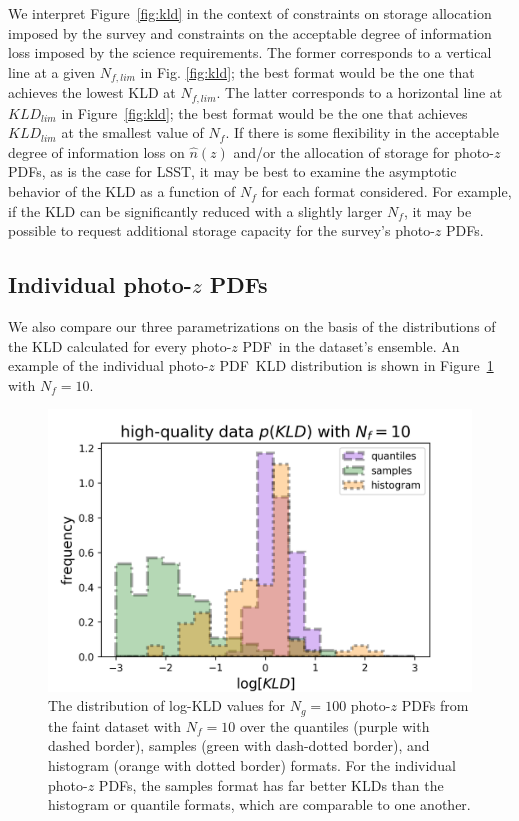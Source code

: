 \documentclass[\docopts]{\docclass}
\newcommand{\pz}{photo-$z$ PDF}
\newcommand{\ssdata}{faint\xspace}
\begin{document}
We interpret Figure~\ref{fig:kld} in the context of constraints on storage 
allocation imposed by the survey and constraints on the acceptable degree of 
information loss imposed by the science requirements.
The former corresponds to a vertical line at a given $N_{f, lim}$ in Fig. 
\ref{fig:kld}; the best format would be the one that achieves the lowest KLD at 
$N_{f, lim}$.
The latter corresponds to a horizontal line at $KLD_{lim}$ in 
Figure~\ref{fig:kld}; the best format would be the one that achieves 
$KLD_{lim}$ at the smallest value of $N_{f}$.
If there is some flexibility in the acceptable degree of information loss on 
$\hat{n}(z)$ and/or the allocation of storage for \pz s, as is the case for 
LSST, it may be best to examine the asymptotic behavior of the KLD as a 
function of $N_{f}$ for each format considered.
For example, if the KLD can be significantly reduced with a slightly larger 
$N_{f}$, it may be possible to request additional storage capacity for the 
survey's \pz s.

\subsection{Individual \pz s}
\label{sec:individual_results}

We also compare our three parametrizations on the basis of the distributions of 
the KLD calculated for every \pz\ in the dataset's ensemble.
An example of the individual \pz\ KLD distribution is shown in 
Figure~\ref{fig:individual} with $N_{f}=10$.

\begin{figure}
  \includegraphics[width=0.9\columnwidth]{figures/individual.png}
  \caption{The distribution of log-KLD values for $N_{g}=100$ \pz s from the 
\ssdata dataset with $N_{f}=10$ over the quantiles (purple with dashed border), 
samples (green with dash-dotted border), and histogram (orange with dotted 
border) formats.
  For the individual \pz s, the samples format has far better KLDs than the 
histogram or quantile formats, which are comparable to one another.
  \label{fig:individual}}
\end{figure}
\end{document}
